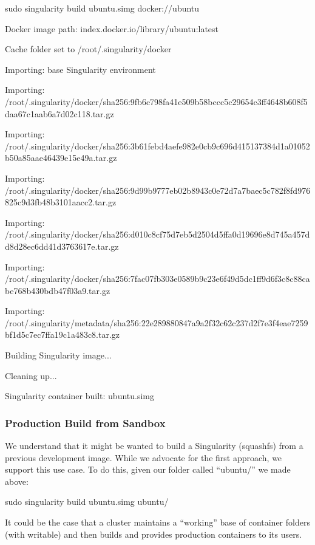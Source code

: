 \documentclass[letterpaper,10pt,english]{sphinxmanual}
\begin{document}
%
\begin{sphinxVerbatim}[commandchars=\\\{\}]
sudo singularity build ubuntu.simg docker://ubuntu

Docker image path: index.docker.io/library/ubuntu:latest

Cache folder set to /root/.singularity/docker

Importing: base Singularity environment

Importing: /root/.singularity/docker/sha256:9fb6c798fa41e509b58bccc5c29654c3ff4648b608f5daa67c1aab6a7d02c118.tar.gz

Importing: /root/.singularity/docker/sha256:3b61febd4aefe982e0cb9c696d415137384d1a01052b50a85aae46439e15e49a.tar.gz

Importing: /root/.singularity/docker/sha256:9d99b9777eb02b8943c0e72d7a7baec5c782f8fd976825c9d3fb48b3101aacc2.tar.gz

Importing: /root/.singularity/docker/sha256:d010c8cf75d7eb5d2504d5ffa0d19696e8d745a457dd8d28ec6dd41d3763617e.tar.gz

Importing: /root/.singularity/docker/sha256:7fac07fb303e0589b9c23e6f49d5dc1ff9d6f3c8c88cabe768b430bdb47f03a9.tar.gz

Importing: /root/.singularity/metadata/sha256:22e289880847a9a2f32c62c237d2f7e3f4eae7259bf1d5c7ec7ffa19c1a483c8.tar.gz

Building Singularity image...

Cleaning up...

Singularity container built: ubuntu.simg
\end{sphinxVerbatim}


\subsubsection{Production Build from Sandbox}
\label{\detokenize{singularity_flow:production-build-from-sandbox}}
We understand that it might be wanted to build a Singularity (squashfs)
from a previous development image. While we advocate for the first
approach, we support this use case. To do this, given our folder called
“ubuntu/” we made above:

%
\begin{sphinxVerbatim}[commandchars=\\\{\}]
sudo singularity build ubuntu.simg ubuntu/
\end{sphinxVerbatim}

It could be the case that a cluster maintains a “working” base of
container folders (with writable) and then builds and provides
production containers to its users.
\end{document}
